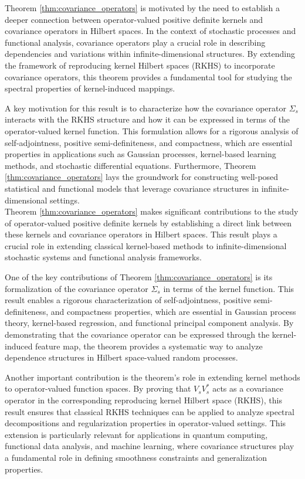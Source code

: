 \documentclass[11pt]{amsart}
\theoremstyle{definition}
\numberwithin{equation}{section}
\begin{document}
Theorem \ref{thm:covariance_operators} is motivated by the need to establish a deeper connection between operator-valued positive definite kernels and covariance operators in Hilbert spaces. In the context of stochastic processes and functional analysis, covariance operators play a crucial role in describing dependencies and variations within infinite-dimensional structures. By extending the framework of reproducing kernel Hilbert spaces (RKHS) to incorporate covariance operators, this theorem provides a fundamental tool for studying the spectral properties of kernel-induced mappings.

A key motivation for this result is to characterize how the covariance operator $\Sigma_s$ interacts with the RKHS structure and how it can be expressed in terms of the operator-valued kernel function. This formulation allows for a rigorous analysis of self-adjointness, positive semi-definiteness, and compactness, which are essential properties in applications such as Gaussian processes, kernel-based learning methods, and stochastic differential equations. Furthermore, Theorem \ref{thm:covariance_operators} lays the groundwork for constructing well-posed statistical and functional models that leverage covariance structures in infinite-dimensional settings.\\

\noindent
Theorem \ref{thm:covariance_operators} makes significant contributions to the study of operator-valued positive definite kernels by establishing a direct link between these kernels and covariance operators in Hilbert spaces. This result plays a crucial role in extending classical kernel-based methods to infinite-dimensional stochastic systems and functional analysis frameworks.

One of the key contributions of Theorem \ref{thm:covariance_operators} is its formalization of the covariance operator $\Sigma_s$ in terms of the kernel function. This result enables a rigorous characterization of self-adjointness, positive semi-definiteness, and compactness properties, which are essential in Gaussian process theory, kernel-based regression, and functional principal component analysis. By demonstrating that the covariance operator can be expressed through the kernel-induced feature map, the theorem provides a systematic way to analyze dependence structures in Hilbert space-valued random processes.

Another important contribution is the theorem’s role in extending kernel methods to operator-valued function spaces. By proving that $V_sV_s^*$ acts as a covariance operator in the corresponding reproducing kernel Hilbert space (RKHS), this result ensures that classical RKHS techniques can be applied to analyze spectral decompositions and regularization properties in operator-valued settings. This extension is particularly relevant for applications in quantum computing, functional data analysis, and machine learning, where covariance structures play a fundamental role in defining smoothness constraints and generalization properties.
\end{document}

